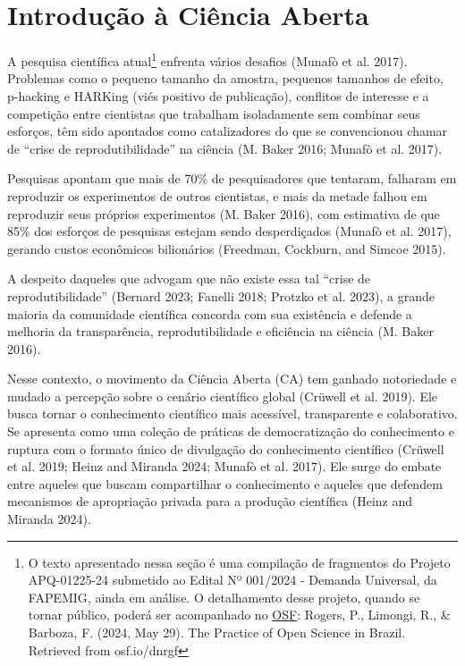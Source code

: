 \documentclass[
  a4paper,
]{article}
\begin{document}

\section{Introdução à Ciência Aberta}\label{sec-intro}

A pesquisa científica atual\footnote{O texto apresentado nessa seção é
  uma compilação de fragmentos do Projeto APQ-01225-24 submetido ao
  Edital Nº 001/2024 - Demanda Universal, da FAPEMIG, ainda em análise.
  O detalhamento desse projeto, quando se tornar público, poderá ser
  acompanhado no \href{http://osf.io/dnrgf}{OSF}: Rogers, P., Limongi,
  R., \& Barboza, F. (2024, May 29). The Practice of Open Science in
  Brazil. Retrieved from osf.io/dnrgf} enfrenta vários desafios (Munafò
et al. 2017). Problemas como o pequeno tamanho da amostra, pequenos
tamanhos de efeito, p-hacking e HARKing (viés positivo de publicação),
conflitos de interesse e a competição entre cientistas que trabalham
isoladamente sem combinar seus esforços, têm sido apontados como
catalizadores do que se convencionou chamar de ``crise de
reprodutibilidade'' na ciência (M. Baker 2016; Munafò et al. 2017).

Pesquisas apontam que mais de 70\% de pesquisadores que tentaram,
falharam em reproduzir os experimentos de outros cientistas, e mais da
metade falhou em reproduzir seus próprios experimentos (M. Baker 2016),
com estimativa de que 85\% dos esforços de pesquisas estejam sendo
desperdiçados (Munafò et al. 2017), gerando custos econômicos
bilionários (Freedman, Cockburn, and Simcoe 2015).

A despeito daqueles que advogam que não existe essa tal ``crise de
reprodutibilidade'' (Bernard 2023; Fanelli 2018; Protzko et al. 2023), a
grande maioria da comunidade científica concorda com sua existência e
defende a melhoria da transparência, reprodutibilidade e eficiência na
ciência (M. Baker 2016).

Nesse contexto, o movimento da Ciência Aberta (CA) tem ganhado
notoriedade e mudado a percepção sobre o cenário científico global
(Crüwell et al. 2019). Ele busca tornar o conhecimento científico mais
acessível, transparente e colaborativo. Se apresenta como uma coleção de
práticas de democratização do conhecimento e ruptura com o formato único
de divulgação do conhecimento científico (Crüwell et al. 2019; Heinz and
Miranda 2024; Munafò et al. 2017). Ele surge do embate entre aqueles que
buscam compartilhar o conhecimento e aqueles que defendem mecanismos de
apropriação privada para a produção científica (Heinz and Miranda 2024).
\end{document}
